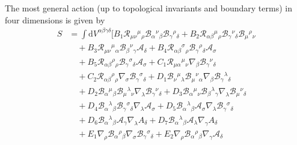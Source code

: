 \documentclass[epj]{svjour}
\begin{document}
The most general action (up to topological invariants and boundary terms) in four dimensions is given by
\begin{equation}
\label{PAG_action}
\begin{split}
S & = \int  \mathrm{d}V^{\alpha \beta \gamma \delta} \bigg[
      B_1 \mathcal{R}_{\mu\nu}{}^{\mu}{}_{\rho}\mathcal{B}_{\alpha}{}^{\nu}{}_{\beta}\mathcal{B}_{\gamma}{}^{\rho}{}_{\delta}
    + B_2 \mathcal{R}_{\alpha\beta}{}^{\mu}{}_{\rho} \mathcal{B}_{\gamma}{}^{\nu}{}_{\delta} \mathcal{B}_{\mu}{}^{\rho}{}_{\nu}
    \\
    & \quad
    + B_3 \mathcal{R}_{\mu\nu}{}^{\mu}{}_{\alpha} \mathcal{B}_{\beta}{}^{\nu}{}_{\gamma} \mathcal{A}_\delta
    + B_4 \mathcal{R}_{\alpha\beta}{}^{\sigma}{}_{\rho}\mathcal{B}_{\gamma}{}^{\rho}{}_{\delta}\mathcal{A}_\sigma
    \\
    & \quad
    + B_5 \mathcal{R}_{\alpha \beta}{}^{\rho}{}_{\rho} \mathcal{B}_{\gamma}{}^{\sigma}{}_{\delta} \mathcal{A}_\sigma
    + C_1 \mathcal{R}_{\mu\alpha}{}^{\mu}{}_{\nu} \nabla_\beta \mathcal{B}_{\gamma}{}^{\nu}{}_{\delta}
    \\
    & \quad
    + C_2 \mathcal{R}_{\alpha\beta}{}^{\rho}{}_{\rho} \nabla_\sigma \mathcal{B}_{\gamma}{}^{\sigma}{}_{\delta}
    + D_1 \mathcal{B}_{\nu}{}^{\mu}{}_{\lambda} \mathcal{B}_{\mu}{}^{\nu}{}_{\alpha} \nabla_\beta \mathcal{B}_{\gamma}{}^{\lambda}{}_{\delta}
    \\
    & \quad
    + D_2 \mathcal{B}_{\alpha}{}^{\mu}{}_{\beta} \mathcal{B}_{\mu}{}^{\lambda}{}_{\nu} \nabla_{\lambda} \mathcal{B}_{\gamma}{}^{\nu}{}_{\delta}
    + D_3 \mathcal{B}_{\alpha}{}^{\mu}{}_{\nu}\mathcal{B}_{\beta}{}^{\lambda}{}_{\gamma} \nabla_\lambda \mathcal{B}_{\mu}{}^{\nu}{}_{\delta}
    \\
    & \quad
    + D_4 \mathcal{B}_{\alpha}{}^{\lambda}{}_{\beta}\mathcal{B}_{\gamma}{}^{\sigma}{}_{\delta}\nabla_\lambda \mathcal{A}_\sigma
    + D_5 \mathcal{B}_{\alpha}{}^{\lambda}{}_{\beta} \mathcal{A}_\sigma \nabla_\lambda \mathcal{B}_{\gamma}{}^{\sigma}{}_{\delta}
    \\
    &\quad
    + D_6 \mathcal{B}_{\alpha}{}^{\lambda}{}_{\beta}\mathcal{A}_\gamma \nabla_\lambda A_\delta
    + D_7\mathcal{B}_{\alpha}{}^{\lambda}{}_{\beta} \mathcal{A}_\lambda \nabla_\gamma A_\delta
    \\
    & \quad
    + E_1\nabla_\rho \mathcal{B}_{\alpha}{}^{\rho}{}_{\beta} \nabla_\sigma \mathcal{B}_{\gamma}{}^{\sigma}{}_{\delta}
    + E_2 \nabla_\rho \mathcal{B}_{\alpha}{}^{\rho}{}_{\beta} \nabla_\gamma \mathcal{A}_\delta

\end{split}
\end{equation}
\end{document}
